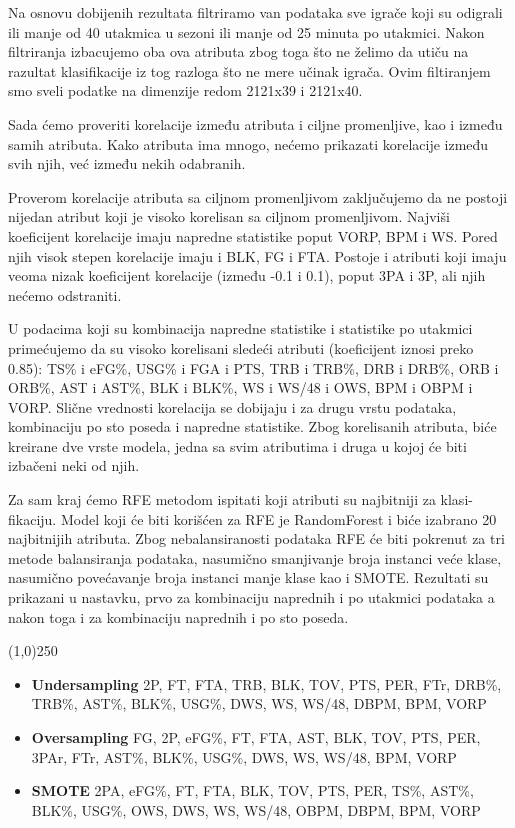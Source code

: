 \documentclass[a4paper]{article}
\begin{document}
Na osnovu dobijenih rezultata filtriramo van podataka sve igrače koji su
odigrali ili manje od 40 utakmica u sezoni ili manje od 25 minuta po utakmici.
Nakon filtriranja izbacujemo oba ova atributa zbog toga što ne želimo da utiču
na razultat klasifikacije iz tog razloga što ne mere učinak igrača. Ovim filtiranjem
smo sveli podatke na dimenzije redom 2121x39 i 2121x40.

Sada ćemo proveriti korelacije između atributa i ciljne promenljive, kao i
između samih atributa. Kako atributa ima mnogo, nećemo prikazati korelacije
između svih njih, već između nekih odabranih.

Proverom korelacije atributa sa ciljnom promenljivom zaključujemo da ne
postoji nijedan atribut koji je visoko korelisan sa ciljnom promenljivom. Najviši
koeficijent korelacije imaju napredne statistike poput VORP, BPM i WS. Pored
njih visok stepen korelacije imaju i BLK, FG i FTA. Postoje i atributi koji
imaju veoma nizak koeficijent korelacije (između -0.1 i 0.1), poput 3PA i 3P, ali njih nećemo odstraniti.

U podacima koji su kombinacija napredne statistike i statistike po utakmici
primećujemo da su visoko korelisani sledeći atributi (koeficijent iznosi preko 0.85): TS\% i eFG\%, USG\% i FGA i PTS, TRB i TRB\%, DRB i DRB\%, ORB i ORB\%, AST i AST\%, BLK i BLK\%, WS i WS/48 i OWS, BPM i OBPM i VORP. Slične vrednosti korelacija se dobijaju i za drugu vrstu podataka, kombinaciju po sto poseda i napredne
statistike. Zbog korelisanih atributa, biće kreirane dve vrste modela, jedna sa svim atributima i druga u kojoj će biti izbačeni neki od njih.

Za sam kraj ćemo RFE metodom ispitati koji atributi su najbitniji za klasi-
fikaciju. Model koji će biti korišćen za RFE je RandomForest i biće izabrano 20
najbitnijih atributa. Zbog nebalansiranosti podataka RFE će biti pokrenut za tri metode balansiranja podataka, nasumično smanjivanje broja instanci veće klase, nasumično povećavanje broja instanci manje klase kao i SMOTE. Rezultati su prikazani u nastavku, prvo za kombinaciju naprednih i po utakmici podataka a nakon toga i za kombinaciju naprednih i po sto poseda.

\begin{center}
\line(1,0){250}
\end{center}

\begin{itemize}
	\item \textbf{Undersampling} 2P, FT, FTA, TRB, BLK, TOV, PTS, PER, FTr,
DRB\%, TRB\%, AST\%, BLK\%, USG\%, DWS, WS, WS/48, DBPM, BPM,
VORP
	\item \textbf{Oversampling} FG, 2P, eFG\%, FT, FTA, AST, BLK, TOV, PTS, PER,
3PAr, FTr, AST\%, BLK\%, USG\%, DWS, WS, WS/48, BPM, VORP
	\item \textbf{SMOTE} 2PA, eFG\%, FT, FTA, BLK, TOV, PTS, PER, TS\%, AST\%,
BLK\%, USG\%, OWS, DWS, WS, WS/48, OBPM, DBPM, BPM, VORP
\end{itemize}
\end{document}
